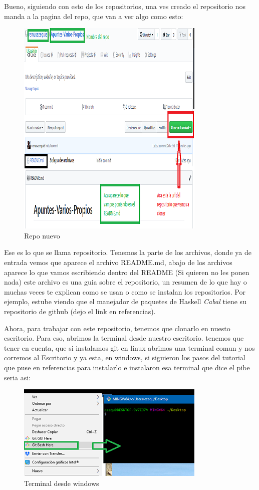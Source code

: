 \documentclass[10pt,journal,compsoc]{IEEEtran}
\begin{document}
\newpage
Bueno, siguiendo con esto de los repositorios, una ves creado el repositorio nos manda a la pagina del repo, que van a ver algo como esto:
\begin{figure}[H]
  \begin{center}
	 \includegraphics{figuras/repoNuevo.png}
	 \centering
	 \renewcommand{\arraystretch}{1.3}
	 \caption{Repo nuevo}
  \end{center}
\end{figure}
Ese es lo que se llama repositorio. Tenemos la parte de los archivos, donde ya de entrada vemos que aparece el archivo README.md, abajo de los archivos aparece lo que vamos escribiendo dentro del README (Si quieren no les ponen nada) este archivo es una guia sobre el repositorio, un resumen de lo que hay o muchas veces te explican como se usan o como se instalan los repositorios. Por ejemplo, estube viendo que el manejador de paquetes de Haskell \textit{Cabal} tiene su repositorio de github (dejo el link en referencias).
 
Ahora, para trabajar con este repositorio, tenemos que clonarlo en nuesto escritorio. Para eso, abrimos la terminal desde nuestro escritorio. tenemos que tener en cuenta, que si instalamos git en linux abrimos una terminal comun y nos corremos al Escritorio y ya esta, en windows, si siguieron los pasos del tutorial que puse en referencias para instalarlo e instalaron esa terminal que dice el pibe seria asi:

 \begin{figure}[H]
  \begin{center}
	 \includegraphics{figuras/consola.png}
	 \centering
	 \renewcommand{\arraystretch}{1.3}
	 \caption{Terminal desde windows}
  \end{center}
\end{figure}
\end{document}
